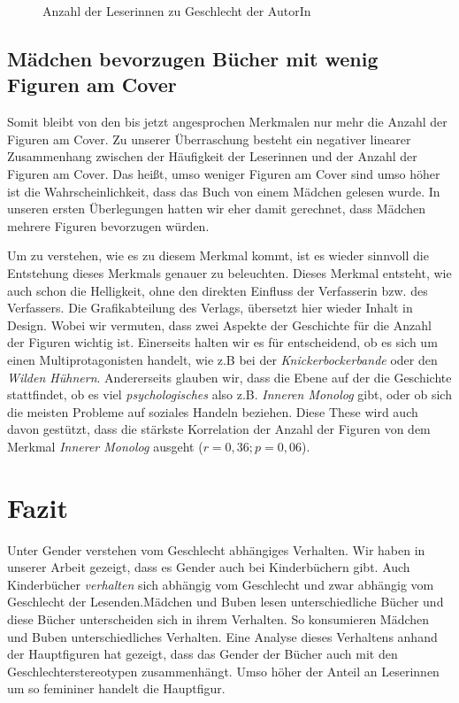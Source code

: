 \begin{figure}
\center
  \vspace{-1.5cm}

  \caption[Leserinnen--Geschlecht]{Anzahl der Leserinnen zu Geschlecht der AutorIn}
  \label{maedchen-geschlecht}

\end{figure}

\section{Mädchen bevorzugen Bücher mit wenig Figuren am Cover}

Somit bleibt von den bis jetzt angesprochen Merkmalen nur mehr die
Anzahl der Figuren am Cover. Zu unserer Überraschung besteht ein
negativer linearer Zusammenhang zwischen der Häufigkeit der Leserinnen
und der Anzahl der Figuren am Cover. Das heißt, umso weniger Figuren am
Cover sind umso höher ist die Wahrscheinlichkeit, dass das Buch von
einem Mädchen gelesen wurde. In unseren ersten Überlegungen hatten wir
eher damit gerechnet, dass Mädchen mehrere Figuren bevorzugen würden.

Um zu verstehen, wie es zu diesem Merkmal kommt, ist es wieder sinnvoll
die Entstehung dieses Merkmals genauer zu beleuchten. Dieses Merkmal
entsteht, wie auch schon die Helligkeit, ohne den direkten Einfluss der
Verfasserin bzw. des Verfassers. Die Grafikabteilung des Verlags,
übersetzt hier wieder Inhalt in Design. Wobei wir vermuten, dass zwei
Aspekte der Geschichte für die Anzahl der Figuren wichtig ist.
Einerseits halten wir es für entscheidend, ob es sich um einen
Multiprotagonisten handelt, wie z.B bei der \emph{Knickerbockerbande}
oder den \emph{Wilden Hühnern}. Andererseits glauben wir, dass die Ebene
auf der die Geschichte stattfindet, ob es viel \emph{psychologisches}
also z.B. \emph{Inneren Monolog} gibt, oder ob sich die meisten Probleme
auf soziales Handeln beziehen. Diese These wird auch davon gestützt,
dass die stärkste Korrelation der Anzahl der Figuren von dem Merkmal
\emph{Innerer Monolog} ausgeht ($r=0{,}36; p=0{,}06$).

\chapter{Fazit}

Unter Gender verstehen  vom Geschlecht
abhängiges Verhalten. Wir haben in unserer Arbeit gezeigt, dass es
Gender auch bei Kinderbüchern gibt. Auch Kinderbücher \emph{verhalten}
sich abhängig vom Geschlecht und zwar abhängig vom Geschlecht der
Lesenden.Mädchen und Buben lesen unterschiedliche Bücher und diese
Bücher unterscheiden sich in ihrem Verhalten. So konsumieren Mädchen und
Buben unterschiedliches Verhalten. Eine Analyse dieses Verhaltens anhand
der Hauptfiguren hat gezeigt, dass das Gender der Bücher auch mit den
Geschlechterstereotypen zusammenhängt. Umso höher der Anteil an
Leserinnen um so femininer handelt die Hauptfigur.

